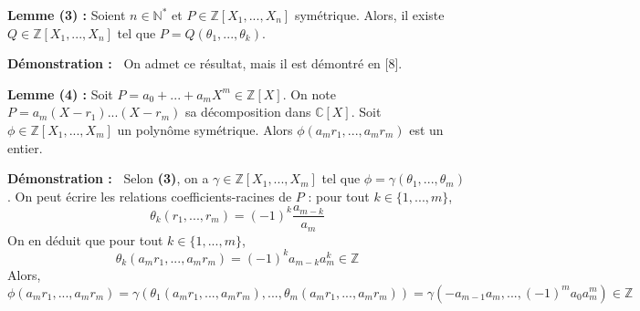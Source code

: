 \documentclass[5pt,a4paper]{article}
\newcommand{\demo}[1]{
    \textbf{Démonstration :~} #1 \newline
}
\begin{document}
\begin{onehalfspacing}
\textbf{Lemme (3) :} Soient $n \in \mathbb{N}^*$ et $P \in \mathbb{Z}[X_1, ..., X_n]$ symétrique. Alors, il existe $Q \in \mathbb{Z}[X_1, ..., X_n]$ tel que $P = Q(\theta_1, ..., \theta_k)$. \newline
\demo{On admet ce résultat, mais il est démontré en [8].}

\textbf{Lemme (4) :} Soit $P = a_0 + ... +a_mX^m \in \mathbb{Z}[X]$. On note $P = a_m(X - r_1)...(X - r_m)$ sa décomposition dans $\mathbb{C}[X]$. Soit $\phi \in \mathbb{Z}[X_1, ..., X_m]$ un polynôme symétrique. Alors $\phi(a_mr_1,...,a_mr_m)$ est un entier. \newline
\demo{Selon \textbf{(3)}, on a $\gamma \in \mathbb{Z}[X_1, ..., X_m]$ tel que $\phi = \gamma(\theta_1, ..., \theta_m)$. On peut écrire les relations coefficients-racines de $P$ : pour tout $k \in \{1, ..., m\}$, 
\[\theta_k(r_1, ..., r_m) = (-1)^k\frac{a_{m-k}}{a_m}\]
On en déduit que pour tout $k \in \{1, ..., m\}$,
\[\theta_k(a_mr_1, ..., a_mr_m) = (-1)^ka_{m-k}a_m^k \in \mathbb{Z}\]
Alors, 
\[\phi(a_mr_1, ..., a_mr_m) = \gamma(\theta_1(a_mr_1, ..., a_mr_m), ..., \theta_m(a_mr_1, ..., a_mr_m)) = \gamma(-a_{m-1}a_m, ..., (-1)^ma_0a_m^m) \in \mathbb{Z}\]
}



\end{onehalfspacing}
\end{document}
